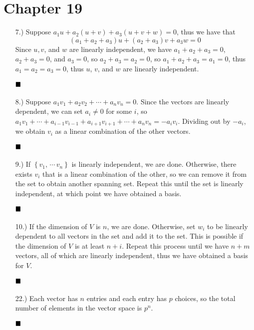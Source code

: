 \documentclass[11pt]{article}
\newcommand{\done}{
    \ensuremath{\strut\hfill\blacksquare}
}
\newcommand{\braces}[1]{\left\{#1\right\}}           %
\begin{document}

\pagestyle{fancy}
\fancyhead{}

\normalsize

\section*{Chapter 19}

\begin{itemize}
    \item [7.)] Suppose $a_1u+a_2(u+v)+a_3(u+v+w)=0$, thus we have that
    \[(a_1+a_2+a_3)u+(a_2+a_3)v+a_3w=0\]
    Since $u,v$, and $w$ are linearly independent, we have $a_1+a_2+a_3=0$,
    $a_2+a_3=0$, and $a_3=0$, so $a_2+a_3=a_2=0$, so $a_1+a_2+a_3=a_1=0$, thus
    $a_1=a_2=a_3=0$, thus $u$, $v$, and $w$ are linearly independent.
    \done

    \item [8.)] Suppose $a_1v_1+a_2v_2+\cdots+a_nv_n=0$. Since the vectors are
    linearly dependent, we can set $a_i\ne0$ for some $i$, so
    $a_1v_1+\cdots+a_{i-1}v_{i-1}+a_{i+1}v_{i+1}+\cdots+a_nv_n=-a_iv_i$.
    Dividing out by $-a_i$, we obtain $v_i$ as a linear combination of the
    other vectors. 
    \done

    \item [9.)] If $\braces{v_1,\,\cdots\,v_n}$ is linearly independent, we are
    done. Otherwise, there exists $v_i$ that is a linear combination of the
    other, so we can remove it from the set to obtain another spanning set.
    Repeat this until the set is linearly independent, at which point we have
    obtained a basis.
    \done

    \item [10.)] If the dimension of $V$ is $n$, we are done. Otherwise, set
    $w_i$ to be linearly dependent to all vectors in the set and add it to the
    set. This is possible if the dimension of $V$ is at least $n+i$. Repeat
    this process until we have $n+m$ vectors, all of which are linearly
    independent, thus we have obtained a basis for $V$.
    \done

    \item [22.)] Each vector has $n$ entries and each entry has $p$ choices,
    so the total number of elements in the vector space is $p^n$.
    \done
\end{itemize}
\end{document}
